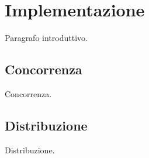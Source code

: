 
\section*{Implementazione}
%
\label{sec:implementazione}

Paragrafo introduttivo.

\subsection*{Concorrenza}
%
\label{sec:implemetazione_concorrenza}

Concorrenza.

\subsection*{Distribuzione}
%
\label{sec:implementazione_distribuzione}

Distribuzione.